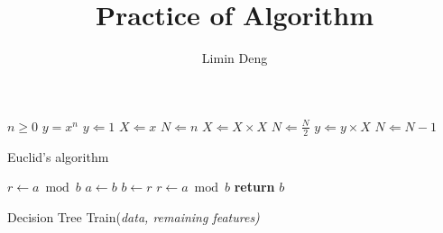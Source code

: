 \documentclass[12pt, a4paper]{article}
\begin{document}
\title{Practice of Algorithm}
\author{Limin Deng}
\date{}
\maketitle


\begin{algorithmic}
\Require $n \geq 0$
\Ensure $y = x^n$
\State $y \Leftarrow 1$
\State $X \Leftarrow x$
\State $N \Leftarrow n$
  \State $X \Leftarrow X \times X$
  \State $N \Leftarrow \frac{N}{2} $  
  \State $y \Leftarrow y \times X$
  \State $N \Leftarrow N - 1$
\EndIf
\EndWhile
\end{algorithmic}



\begin{algorithm}
\caption{Euclid’s algorithm}\label{euclid} %
\begin{algorithmic}[1] %
   \State $r\gets a\bmod b$
      \State $a\gets b$
      \State $b\gets r$
      \State $r\gets a\bmod b$
   \EndWhile\label{euclidendwhile}
   \State \textbf{return} $b$
\EndProcedure
\end{algorithmic}
\end{algorithm}



\begin{algorithm}
\caption{Decision Tree Train(\emph{data, remaining features)}}
\begin{algorithmic}[1]

\end{algorithmic}
\end{algorithm}
\end{document}
